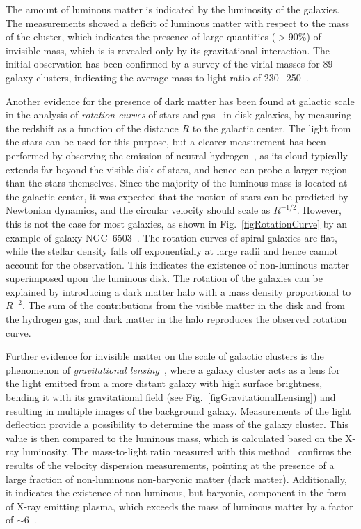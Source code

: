 The amount of luminous matter is indicated by the luminosity of the galaxies. The measurements showed a deficit of luminous matter with respect to the mass of the cluster, which indicates the presence of large quantities ($>$90\%) of invisible mass, which is is revealed only by its gravitational interaction. The initial observation has been confirmed by a survey of the virial masses for 89 galaxy clusters, indicating the average mass-to-light ratio of 230$-$250~\cite{VirialMasses}.

Another evidence for the presence of dark matter has been found at galactic scale in the analysis of {\it rotation curves} of stars and gas~\cite{RotationCurves_Rubin} in disk galaxies, by measuring the redshift as a function of the distance $R$ to the galactic center. The light from the stars can be used for this purpose, but a clearer measurement has been performed by observing the emission of neutral hydrogen~\cite{RotationCurves_Begeman}, as its cloud typically extends far beyond the visible disk of stars, and hence can probe a larger region than the stars themselves. Since the majority of the luminous mass is located at the galactic center, it was expected that the motion of stars can be predicted by Newtonian dynamics, and the circular velocity should scale as $R^{-1/2}$. However, this is not the case for most galaxies, as shown in Fig.~\ref{figRotationCurve} by an example of galaxy NGC~6503~\cite{RotationCurves_Begeman}. The rotation curves of spiral galaxies are flat, while the stellar density falls off exponentially at large radii and hence cannot account for the observation. 
This indicates the existence of non-luminous matter superimposed upon the luminous disk. The rotation of the galaxies can be explained by introducing a dark matter halo with a mass density proportional to $R^{-2}$. The sum of the contributions from the visible matter in the disk and from the hydrogen gas, and dark matter in the halo reproduces the observed rotation curve.

Further evidence for invisible matter on the scale of galactic clusters is the phenomenon of {\it gravitational lensing}~\cite{GravitationalLensing_Review}, where a galaxy cluster acts as a lens for the light emitted from a more distant galaxy with high surface brightness, bending it with its gravitational field (see Fig.~\ref{figGravitationalLensing}) and resulting in multiple images of the background galaxy. Measurements of the light deflection provide a possibility to determine the mass of the galaxy cluster. This value is then compared to the luminous mass, which is calculated based on the X-ray luminosity. The mass-to-light ratio measured with this method~\cite{GravitationalLensing_Observation} confirms the results of the velocity dispersion measurements, pointing at the presence of a large fraction of non-luminous non-baryonic matter (dark matter). Additionally, it indicates the existence of non-luminous, but baryonic, component in the form of X-ray emitting plasma, which exceeds the mass of luminous matter by a factor of $\sim$6~\cite{GravitationalLensing_XrayPlasma}.

